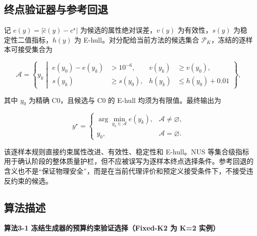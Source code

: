 \subsection{终点验证器与参考回退}

记 \(e(y)=|\hat c(y)-c^{\star}|\) 为候选的属性绝对误差，\(v(y)\) 为有效性，\(s(y)\) 为稳定性二值指标，\(h(y)\) 为 E-hull。对分配给当前方法的候选集合 \(\mathcal P_K\)，冻结的逐样本可接受集合为

\[
\mathcal A=
\left\{y_k\middle|
\begin{aligned}
e(y_0)-e(y_k)&>10^{-6},&
v(y_k)&\ge v(y_0),\\
s(y_k)&\ge s(y_0),&
h(y_k)&\le h(y_0)+0.01
\end{aligned}
\right\},
\]

其中 \(y_0\) 为精确 C0，且候选与 C0 的 E-hull 均须为有限值。最终输出为

\[
y^{\star}=
\begin{cases}
\displaystyle\arg\min_{y_k\in\mathcal A}e(y_k), & \mathcal A\ne\varnothing,\\
y_0, & \mathcal A=\varnothing.
\end{cases}
\]

该逐样本规则直接约束属性改进、有效性、稳定性和 E-hull。NUS 等集合级指标用于确认阶段的整体质量护栏，但不应被误写为逐样本终点选择条件。参考回退的含义也不是``保证物理安全''，而是在当前代理评价和预定义接受条件下，不接受违反约束的候选。

\subsection{算法描述}

\textbf{算法3-1 冻结生成器的预算约束验证选择（Fixed-K2 为 K=2 实例）}

\begin{Shaded}
\begin{Highlighting}[]

\end{Highlighting}
\end{Shaded}

